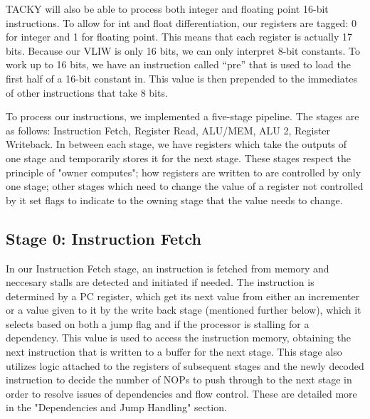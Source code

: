 \documentclass[sigconf]{acmart}
\begin{document}
TACKY will also be able to process both integer and floating point 16-bit instructions. To allow for int and float differentiation, our registers are tagged: 0 for integer and 1 for floating point. This means that each register is actually 17 bits. Because our VLIW is only 16 bits, we can only interpret 8-bit constants. To work up to 16 bits, we have an instruction called “pre” that is used to load the first half of a 16-bit constant in. This value is then prepended to the immediates of other instructions that take 8 bits.

To process our instructions, we implemented a five-stage pipeline. The stages are as follows: Instruction Fetch, Register Read, ALU/MEM, ALU 2, Register Writeback. In between each stage, we have registers which take the outputs of one stage and temporarily stores it for the next stage. These stages respect the principle of "owner computes"; how registers are written to are controlled by only one stage; other stages which need to change the value of a register not controlled by it set flags to indicate to the owning stage that the value needs to change. 

\subsection{Stage 0: Instruction Fetch}
In our Instruction Fetch stage, an instruction is fetched from memory and neccesary stalls are detected and initiated if needed. The instruction is determined by a PC register, which get its next value from either an incrementer or a value given to it by the write back stage (mentioned further below), which it selects based on both a jump flag and if the processor is stalling for a dependency. This value is used to access the instruction memory, obtaining the next instruction that is written to a buffer for the next stage. This stage also utilizes logic attached to the registers of subsequent stages and the newly decoded instruction to decide the number of NOPs to push through to the next stage in order to resolve issues of dependencies and flow control. These are detailed more in the "Dependencies and Jump Handling" section.
\end{document}
